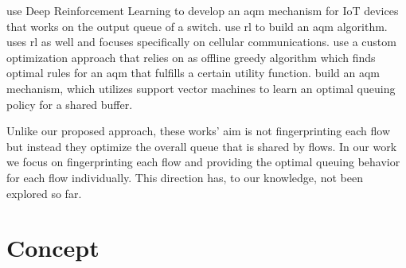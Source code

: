 \documentclass[conference]{IEEEtran}
\begin{document}
\cite{kim_deep_2019} use Deep Reinforcement Learning to develop an \gls{aqm} mechanism for IoT devices that works on the output queue of a switch.  \cite{bouacida_practical_2019,bisoy_design_2017} use \gls{rl} to build an \gls{aqm} algorithm. \cite{vucevic_reinforcement_2007} uses \gls{rl} as well and focuses specifically on cellular communications. \cite{lin_kemy_2015} use a custom optimization approach that relies on as offline greedy algorithm which finds optimal rules for an \gls{aqm} that fulfills a certain utility function. \cite{shah_sam_2016} build an \gls{aqm} mechanism, which utilizes support vector machines to learn an optimal queuing policy for a shared buffer. 

Unlike our proposed approach, these works' aim is not fingerprinting each flow but instead they optimize the overall queue that is shared by flows. In our work we focus on fingerprinting each flow and providing the optimal queuing behavior for each flow individually. This direction has, to our knowledge, not been explored so far. 

\section{Concept}
\label{sec:concept}
\end{document}
